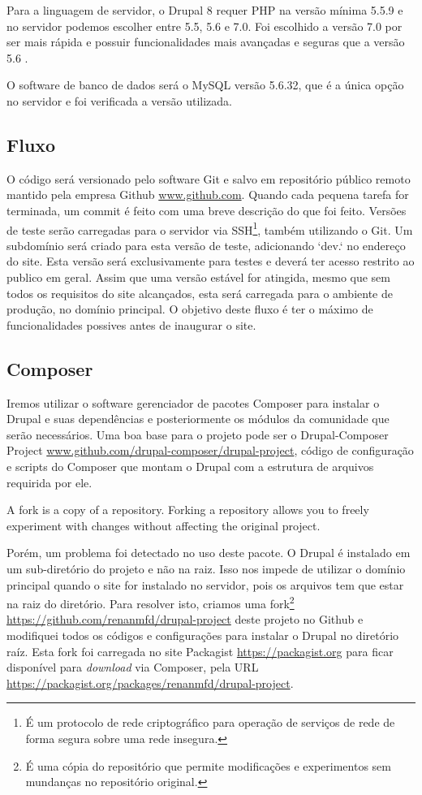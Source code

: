 Para a linguagem de servidor, o Drupal 8 requer PHP na versão mínima 5.5.9 e no servidor podemos escolher entre 5.5, 5.6 e 7.0. Foi escolhido a versão 7.0 por ser mais rápida \cite{PHP7Velocidade} e possuir funcionalidades mais avançadas e seguras que a versão 5.6 \cite{PHP7}.

O software de banco de dados será o MySQL versão 5.6.32, que é a única opção no servidor e foi verificada a versão utilizada.

\subsection{Fluxo}
O código será versionado pelo software Git e salvo em repositório público remoto mantido pela empresa Github \url{www.github.com}. Quando cada pequena tarefa for terminada, um commit é feito com uma breve descrição do que foi feito. Versões de teste serão carregadas para o servidor via SSH\footnote{É um protocolo de rede criptográfico para operação de serviços de rede de forma segura sobre uma rede insegura\cite{SSH}.}, também utilizando o Git. Um subdomínio será criado para esta versão de teste, adicionando `dev.` no endereço do site. Esta versão será exclusivamente para testes e deverá ter acesso restrito ao publico em geral. Assim que uma versão estável for atingida, mesmo que sem todos os requisitos do site alcançados, esta será carregada para o ambiente de produção, no domínio principal. O objetivo deste fluxo é ter o máximo de funcionalidades possives antes de inaugurar o site.

\subsection{Composer}
Iremos utilizar o software gerenciador de pacotes Composer para instalar o Drupal e suas dependências e posteriormente os módulos da comunidade que serão necessários. Uma boa base para o projeto pode ser o Drupal-Composer Project \url{www.github.com/drupal-composer/drupal-project}, código de configuração e scripts do Composer que montam o Drupal com a estrutura de arquivos requirida por ele.

A fork is a copy of a repository. Forking a repository allows you to freely experiment with changes without affecting the original project.

Porém, um problema foi detectado no uso deste pacote. O Drupal é instalado em um sub-diretório do projeto e não na raiz. Isso nos impede de utilizar o domínio principal quando o site for instalado no servidor, pois os arquivos tem que estar na raiz do diretório. Para resolver isto, criamos uma fork\footnote{É uma cópia do repositório que permite modificações e experimentos sem mundanças no repositório original.} \url{https://github.com/renanmfd/drupal-project} deste projeto no Github e modifiquei todos os códigos e configurações para instalar o Drupal no diretório raíz. Esta fork foi carregada no site Packagist \url{https://packagist.org} para ficar disponível para \textit{download} via Composer, pela URL \url{https://packagist.org/packages/renanmfd/drupal-project}.

